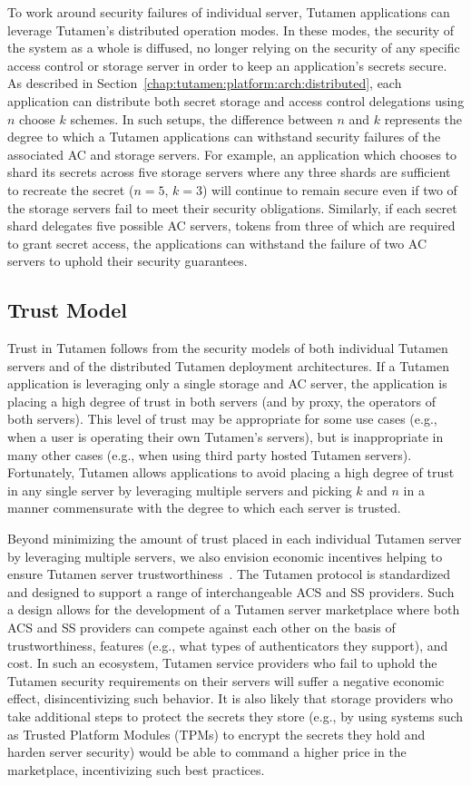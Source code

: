To work around security failures of individual server, Tutamen
applications can leverage Tutamen's distributed operation modes. In
these modes, the security of the system as a whole is diffused, no
longer relying on the security of any specific access control or
storage server in order to keep an application's secrets secure. As
described in Section~\ref{chap:tutamen:platform:arch:distributed},
each application can distribute both secret storage and access control
delegations using $n$ choose $k$ schemes. In such setups, the
difference between $n$ and $k$ represents the degree to which a
Tutamen applications can withstand security failures of the associated
AC and storage servers. For example, an application which chooses to
shard its secrets across five storage servers where any three shards
are sufficient to recreate the secret ($n=5$, $k=3$) will continue to
remain secure even if two of the storage servers fail to meet their
security obligations. Similarly, if each secret shard delegates five
possible AC servers, tokens from three of which are required to grant
secret access, the applications can withstand the failure of two AC
servers to uphold their security guarantees.

\subsection{Trust Model}

Trust in Tutamen follows from the security models of both individual
Tutamen servers and of the distributed Tutamen deployment
architectures. If a Tutamen application is leveraging only a single
storage and AC server, the application is placing a high degree of
trust in both servers (and by proxy, the operators of both
servers). This level of trust may be appropriate for some use cases
(e.g., when a user is operating their own Tutamen's servers), but is
inappropriate in many other cases (e.g., when using third party hosted
Tutamen servers). Fortunately, Tutamen allows applications to avoid
placing a high degree of trust in any single server by leveraging
multiple servers and picking $k$ and $n$ in a manner commensurate with
the degree to which each server is trusted.

Beyond minimizing the amount of trust placed in each individual
Tutamen server by leveraging multiple servers, we also envision
economic incentives helping to ensure Tutamen server
trustworthiness~\cite{anderson2001}. The Tutamen protocol is
standardized and designed to support a range of interchangeable ACS
and SS providers. Such a design allows for the development of a
Tutamen server marketplace where both ACS and SS providers can compete
against each other on the basis of trustworthiness, features (e.g.,
what types of authenticators they support), and cost. In such an
ecosystem, Tutamen service providers who fail to uphold the Tutamen
security requirements on their servers will suffer a negative economic
effect, disincentivizing such behavior. It is also likely that storage
providers who take additional steps to protect the secrets they store
(e.g., by using systems such as Trusted Platform Modules (TPMs) to
encrypt the secrets they hold and harden server security) would be
able to command a higher price in the marketplace, incentivizing such
best practices.

